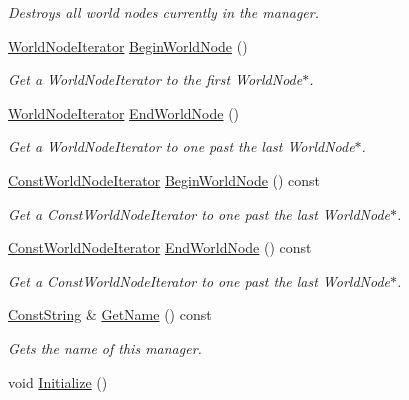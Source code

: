 \begin{DoxyCompactItemize}
\begin{DoxyCompactList}\small\item\em Destroys all world nodes currently in the manager. \item\end{DoxyCompactList}\item 
\hyperlink{classphys_1_1SceneManager_a67b62f6e9116423306b82e20cb2415fd}{WorldNodeIterator} \hyperlink{classphys_1_1SceneManager_a6fe8d95fd8989d93e0a47765dfa05049}{BeginWorldNode} ()
\begin{DoxyCompactList}\small\item\em Get a WorldNodeIterator to the first WorldNode$\ast$. \item\end{DoxyCompactList}\item 
\hyperlink{classphys_1_1SceneManager_a67b62f6e9116423306b82e20cb2415fd}{WorldNodeIterator} \hyperlink{classphys_1_1SceneManager_aeac64d80d1fcad273efb1c1a8ca2380c}{EndWorldNode} ()
\begin{DoxyCompactList}\small\item\em Get a WorldNodeIterator to one past the last WorldNode$\ast$. \item\end{DoxyCompactList}\item 
\hyperlink{classphys_1_1SceneManager_aa893eadb43492c0a4a9cafe2d150742c}{ConstWorldNodeIterator} \hyperlink{classphys_1_1SceneManager_abd11df0871af0e96b3ed7a5030cf43d2}{BeginWorldNode} () const 
\begin{DoxyCompactList}\small\item\em Get a ConstWorldNodeIterator to one past the last WorldNode$\ast$. \item\end{DoxyCompactList}\item 
\hyperlink{classphys_1_1SceneManager_aa893eadb43492c0a4a9cafe2d150742c}{ConstWorldNodeIterator} \hyperlink{classphys_1_1SceneManager_a78b89a81744dbc32b8723da55734c279}{EndWorldNode} () const 
\begin{DoxyCompactList}\small\item\em Get a ConstWorldNodeIterator to one past the last WorldNode$\ast$. \item\end{DoxyCompactList}\item 
\hyperlink{namespacephys_a5ce5049f8b4bf88d6413c47b504ebb31}{ConstString} \& \hyperlink{classphys_1_1SceneManager_a3f06260dffe9c70f17934cdfe41bd5a5}{GetName} () const 
\begin{DoxyCompactList}\small\item\em Gets the name of this manager. \item\end{DoxyCompactList}\item 
\hypertarget{classphys_1_1SceneManager_aa13b380a4e38f706a1977237fc4b165e}{
void \hyperlink{classphys_1_1SceneManager_aa13b380a4e38f706a1977237fc4b165e}{Initialize} ()}
\label{classphys_1_1SceneManager_aa13b380a4e38f706a1977237fc4b165e}


\end{DoxyCompactItemize}
